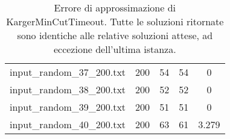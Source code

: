 \begin{table}[H]
\begin{tabular}{lrccc}
     input\_random\_37\_200.txt &     200 &        54 &                 54 &           0     \\
     input\_random\_38\_200.txt &     200 &        52 &                 52 &           0     \\
     input\_random\_39\_200.txt &     200 &        51 &                 51 &           0     \\
     input\_random\_40\_200.txt &     200 &        \cellcolor{red!25}63 &                 61 &           \cellcolor{red!25}3.279 \\
     \hline
    \end{tabular}

    \caption{Errore di approssimazione di KargerMinCutTimeout. Tutte le soluzioni ritornate sono identiche alle relative soluzioni attese, ad eccezione dell'ultima istanza.}
    \label{table:kargertimeout-approx-error}
\end{table}
